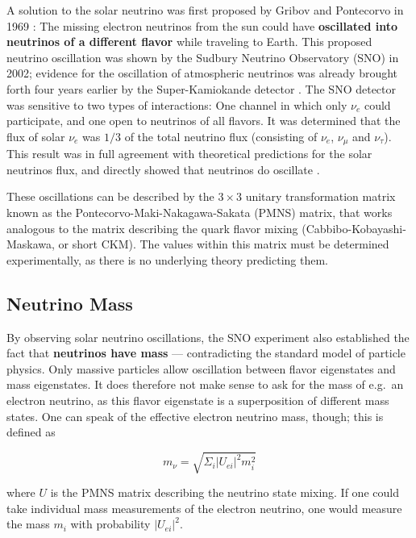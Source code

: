 A solution to the solar neutrino was first proposed by Gribov and Pontecorvo in 1969 : The missing electron neutrinos from the sun could have \textbf{oscillated into neutrinos of a different flavor} while traveling to Earth. This proposed neutrino oscillation was shown by the Sudbury Neutrino Observatory (SNO) in 2002; evidence for the oscillation of atmospheric neutrinos was already brought forth four years earlier by the Super-Kamiokande detector . The SNO detector was sensitive to two types of interactions: One channel in which only $\nu_e$ could participate, and one open to neutrinos of all flavors. It was determined that the flux of solar $\nu_e$  was $1/3$ of the total neutrino flux (consisting of $\nu_e$, $\nu_\mu$ and $\nu_\tau$). This result was in full agreement with theoretical predictions for the solar neutrinos flux, and directly showed that neutrinos do oscillate .

These oscillations can be described by the $3\times3$ unitary transformation matrix known as the Pontecorvo-Maki-Nakagawa-Sakata (PMNS) matrix, that works analogous to the matrix describing the quark flavor mixing (Cabbibo-Kobayashi-Maskawa, or short CKM). The values within this matrix must be determined experimentally, as there is no underlying theory predicting them.

\subsection{Neutrino Mass}
By observing solar neutrino oscillations, the SNO experiment also established the fact that \textbf{neutrinos have mass} --- contradicting the standard model of particle physics. Only massive particles allow oscillation between flavor eigenstates and mass eigenstates. It does therefore not make sense to ask for the mass of e.g.\ an electron neutrino, as this flavor eigenstate is a superposition of different mass states. One can speak of the effective electron neutrino mass, though; this is defined as

\begin{equation}
    m_\nu = \sqrt{ \Sigma_i |U_{ei}|^2 m_i^2 }
\end{equation}

where $U$ is the PMNS matrix describing the neutrino state mixing. If one could take individual mass measurements of the electron neutrino, one would measure the mass $m_i$ with probability $|U_{ei}|^2$.

